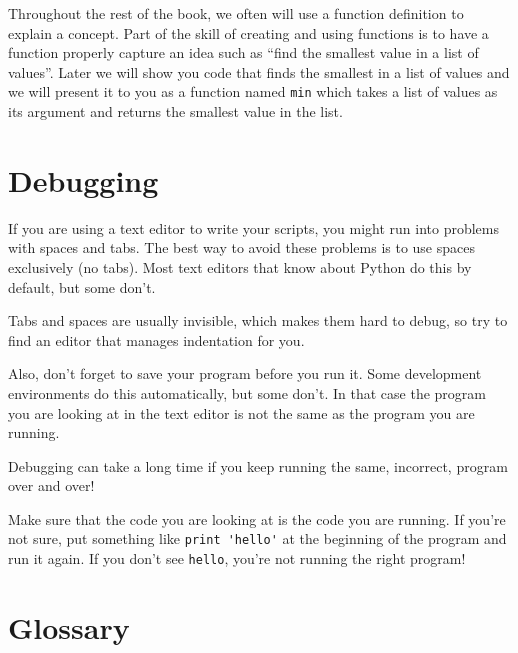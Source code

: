 \documentclass[10pt]{book}
\begin{document}
Throughout the rest of the book, we often will use a function definition to 
explain a concept.  Part of the skill of creating and using functions is
to have a function properly capture an idea such as ``find the smallest
value in a list of values''.  Later we will show you code that finds
the smallest in a list of values and we will present it to you as a function
named {\tt min} which takes a list of values as its argument and 
returns the smallest value in the list.


\section{Debugging}
\label{editor}

If you are using a text editor to write your scripts, you might
run into problems with spaces and tabs.  The best way to avoid
these problems is to use spaces exclusively (no tabs).  Most text
editors that know about Python do this by default, but some
don't.


Tabs and spaces are usually invisible, which makes them
hard to debug, so try to find an editor that manages indentation
for you.

Also, don't forget to save your program before you run it.  Some
development environments do this automatically, but some don't.
In that case the program you are looking at in the text editor
is not the same as the program you are running.

Debugging can take a long time if you keep running the same,
incorrect, program over and over!

Make sure that the code you are looking at is the code you are running.
If you're not sure, put something like \verb"print 'hello'" at the
beginning of the program and run it again.  If you don't see
\verb"hello", you're not running the right program!




\section{Glossary}
\end{document}
